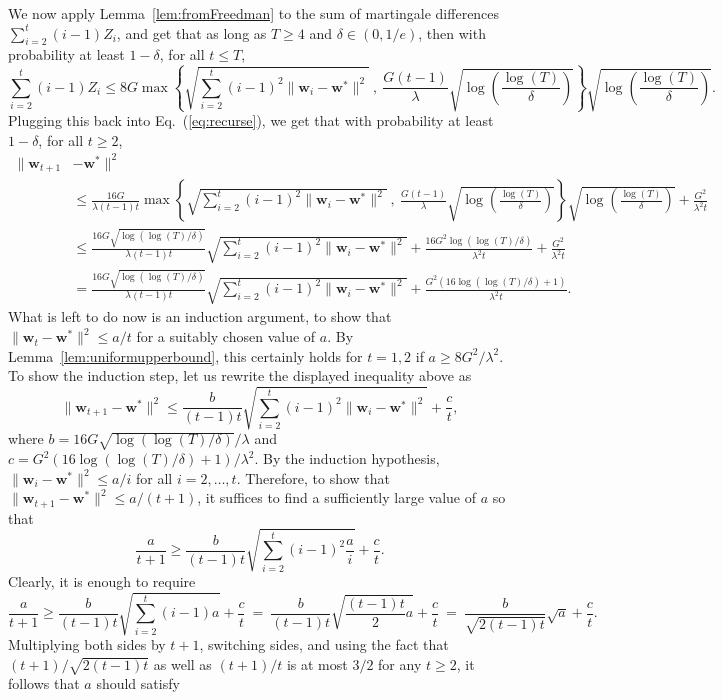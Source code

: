 \documentclass{article}
\newcommand{\bw}{\mathbf{w}}
\newcommand{\norm}[1]{\|#1\|}
\renewcommand{\eqref}[1]{Eq.~(\ref{#1})}
\newcommand{\lemref}[1]{Lemma~\ref{#1}}
\begin{document}
We now apply Lemma~\ref{lem:fromFreedman} to the sum of martingale differences $\sum_{i= 2}^{t}(i-1)Z_i$, and get that as long as $T\geq 4$ and $\delta\in (0,1/e)$, then with probability at least $1-\delta$, for all $t\leq T$,
\[
\sum_{i=2}^{t}(i-1)Z_i \leq 8 G \max\left\{\sqrt{\sum_{i=2}^t(i-1)^2 \norm{\bw_i-\bw^*}^2}~,~ \frac{G(t-1)}{\lambda}\sqrt{\log\left(\frac{\log(T)}{\delta}\right)} \right\} \sqrt{\log\left(\frac{\log(T)}{\delta}\right)}.
\]
Plugging this back into \eqref{eq:recurse}, we get that with probability at least $1-\delta$, for all $t\geq 2$,
\begin{align*}
\norm{\bw_{t+1}&-\bw^*}^2 \\
&\leq \frac{16G}{\lambda(t-1)t}\max\left\{\sqrt{\sum_{i=2}^t(i-1)^2 \norm{\bw_{i}-\bw^*}^2}~,~ \frac{G(t-1)}{\lambda}\sqrt{\log\left(\frac{\log(T)}{\delta}\right)} \right\} \sqrt{\log\left(\frac{\log(T)}{\delta}\right)}  +
\frac{G^2}{\lambda^2 t}\\
&\leq \frac{16G\sqrt{\log(\log(T)/\delta)}}{\lambda(t-1)t}\sqrt{\sum_{i=2}^t(i-1)^2 \norm{\bw_{i}-\bw^*}^2}+\frac{16G^2 \log(\log(T)/\delta)}{\lambda^2 t}+\frac{G^2}{\lambda^2 t}\\
&= \frac{16G\sqrt{\log(\log(T)/\delta)}}{\lambda(t-1)t}\sqrt{\sum_{i=2}^t(i-1)^2 \norm{\bw_{i}-\bw^*}^2}+\frac{G^2(16\log(\log(T)/\delta)+1)}{\lambda^2 t}.
\end{align*}
What is left to do now is an induction argument, to show that $\norm{\bw_t-\bw^*}^2 \leq a/t$ for a suitably chosen value of $a$. By \lemref{lem:uniformupperbound}, this certainly holds for $t=1,2$ if $a\geq 8G^2/\lambda^2$. To show the induction step, let us rewrite the displayed inequality above as
\[
\norm{\bw_{t+1}-\bw^*}^2 \leq \frac{b}{(t-1)t}\sqrt{\sum_{i=2}^t(i-1)^2 \norm{\bw_{i}-\bw^*}^2}+\frac{c}{t},
\]
where $b=16G\sqrt{\log(\log(T)/\delta)}/\lambda$ and $c=G^2(16\log(\log(T)/\delta)+1)/\lambda^2$. By the induction hypothesis, $\norm{\bw_{i}-\bw^*}^2\leq a/i$ for all $i=2,\ldots,t$. Therefore, to show that $\norm{\bw_{t+1}-\bw^*}^2\leq a/(t+1)$, it suffices to find a sufficiently large value of $a$ so that
\[
\frac{a}{t+1}\geq \frac{b}{(t-1)t}\sqrt{\sum_{i=2}^t(i-1)^2 \frac{a}{i}}+\frac{c}{t}.
\]
Clearly, it is enough to require
\[
\frac{a}{t+1}\geq \frac{b}{(t-1)t}\sqrt{\sum_{i=2}^t (i-1) a}+\frac{c}{t}
~=~ \frac{b}{(t-1)t}\sqrt{\frac{(t-1)t}{2} a}+\frac{c}{t}
~=~ \frac{b}{\sqrt{2(t-1)t}}\sqrt{a}+\frac{c}{t}.
\]
Multiplying both sides by $t+1$, switching sides, and using the fact that $(t+1)/\sqrt{2(t-1)t}$ as well as $(t+1)/t$ is at most $3/2$ for any $t\geq 2$, it follows that $a$ should satisfy
\end{document}
